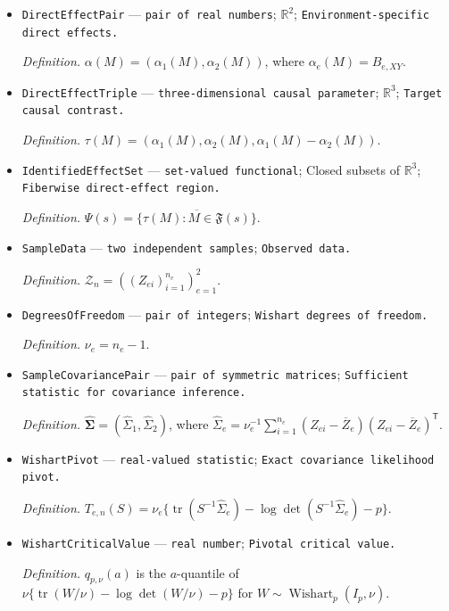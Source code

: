 \documentclass{article}
\begin{document}
\begin{itemize}
  \item \texttt{DirectEffectPair} --- \texttt{pair of real numbers}; \(\mathbb R^2\); \texttt{Environment-\allowbreak{}specific direct effects.}
  \par\smallskip\noindent\emph{Definition.} \(\alpha(M)=(\alpha_1(M),\alpha_2(M))\), where \(\alpha_e(M)=B_{e,XY}\).
  \item \texttt{DirectEffectTriple} --- \texttt{three-\allowbreak{}dimensional causal parameter}; \(\mathbb R^3\); \texttt{Target causal contrast.}
  \par\smallskip\noindent\emph{Definition.} \(\tau(M)=(\alpha_1(M),\alpha_2(M),\alpha_1(M)-\alpha_2(M))\).
  \item \texttt{IdentifiedEffectSet} --- \texttt{set-\allowbreak{}valued functional}; Closed subsets of \(\mathbb R^3\); \texttt{Fiberwise direct-\allowbreak{}effect region.}
  \par\smallskip\noindent\emph{Definition.} \(\Psi(s)=\overline{\{\tau(M):M\in\mathfrak F(s)\}}\).
  \item \texttt{SampleData} --- \texttt{two independent samples}; \texttt{Observed data.}
  \par\smallskip\noindent\emph{Definition.} \(\mathcal Z_n=((Z_{ei})_{i=1}^{n_e})_{e=1}^2\).
  \item \texttt{DegreesOfFreedom} --- \texttt{pair of integers}; \texttt{Wishart degrees of freedom.}
  \par\smallskip\noindent\emph{Definition.} \(\nu_e=n_e-1\).
  \item \texttt{SampleCovariancePair} --- \texttt{pair of symmetric matrices}; \texttt{Sufficient statistic for covariance inference.}
  \par\smallskip\noindent\emph{Definition.} \(\widehat{\boldsymbol\Sigma}=(\widehat\Sigma_1,\widehat\Sigma_2)\), where \(\widehat\Sigma_e=\nu_e^{-1}\sum_{i=1}^{n_e}(Z_{ei}-\overline Z_e)(Z_{ei}-\overline Z_e)^{\mathsf T}\).
  \item \texttt{WishartPivot} --- \texttt{real-\allowbreak{}valued statistic}; \texttt{Exact covariance likelihood pivot.}
  \par\smallskip\noindent\emph{Definition.} \(T_{e,n}(S)=\nu_e\{\operatorname{tr}(S^{-1}\widehat\Sigma_e)-\log\det(S^{-1}\widehat\Sigma_e)-p\}\).
  \item \texttt{WishartCriticalValue} --- \texttt{real number}; \texttt{Pivotal critical value.}
  \par\smallskip\noindent\emph{Definition.} \(q_{p,\nu}(a)\) is the \(a\)-quantile of \(\nu\{\operatorname{tr}(W/\nu)-\log\det(W/\nu)-p\}\) for \(W\sim\operatorname{Wishart}_p(I_p,\nu)\).

\end{itemize}
\end{document}
